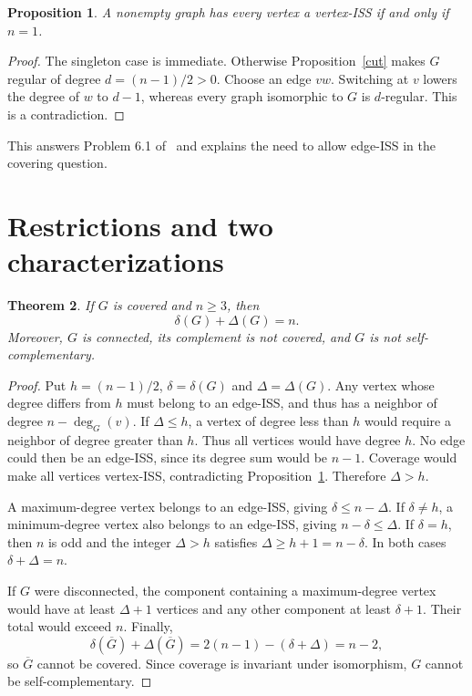 \documentclass[11pt]{article}
\newtheorem{theorem}{Theorem}
\newtheorem{proposition}[theorem]{Proposition}
\theoremstyle{definition}
\begin{document}
\begin{proposition}\label{singletons}
A nonempty graph has every vertex a vertex-ISS if and only if $n=1$.
\end{proposition}
\begin{proof}
The singleton case is immediate. Otherwise Proposition~\ref{cut} makes
$G$ regular of degree $d=(n-1)/2>0$. Choose an edge $vw$. Switching at
$v$ lowers the degree of $w$ to $d-1$, whereas every graph isomorphic to
$G$ is $d$-regular. This is a contradiction.
\end{proof}
This answers Problem 6.1 of~\cite{gervacio} and explains the need to
allow edge-ISS in the covering question.

\section{Restrictions and two characterizations}
\begin{theorem}\label{extremes}
If $G$ is covered and $n\geq3$, then
\[
 \delta(G)+\Delta(G)=n.
\]
Moreover, $G$ is connected, its complement is not covered, and $G$ is
not self-complementary.
\end{theorem}
\begin{proof}
Put $h=(n-1)/2$, $\delta=\delta(G)$ and $\Delta=\Delta(G)$.
Any vertex whose degree differs from $h$ must belong to an edge-ISS,
and thus has a neighbor of degree $n-\deg_G(v)$.
If $\Delta\leq h$, a vertex of degree less than $h$ would require a
neighbor of degree greater than $h$. Thus all vertices would have degree
$h$. No edge could then be an edge-ISS, since its degree sum would be
$n-1$. Coverage would make all vertices vertex-ISS, contradicting
Proposition~\ref{singletons}. Therefore $\Delta>h$.

A maximum-degree vertex belongs to an edge-ISS, giving
$\delta\leq n-\Delta$. If $\delta\ne h$, a minimum-degree vertex
also belongs to an edge-ISS, giving $n-\delta\leq\Delta$.
If $\delta=h$, then $n$ is odd and the integer $\Delta>h$ satisfies
$\Delta\geq h+1=n-\delta$. In both cases $\delta+\Delta=n$.

If $G$ were disconnected, the component containing a maximum-degree
vertex would have at least $\Delta+1$ vertices and any other component
at least $\delta+1$. Their total would exceed $n$.
Finally,
\[
 \delta(\overline G)+\Delta(\overline G)
 =2(n-1)-(\delta+\Delta)=n-2,
\]
so $\overline G$ cannot be covered. Since coverage is invariant under
isomorphism, $G$ cannot be self-complementary.
\end{proof}
\end{document}
